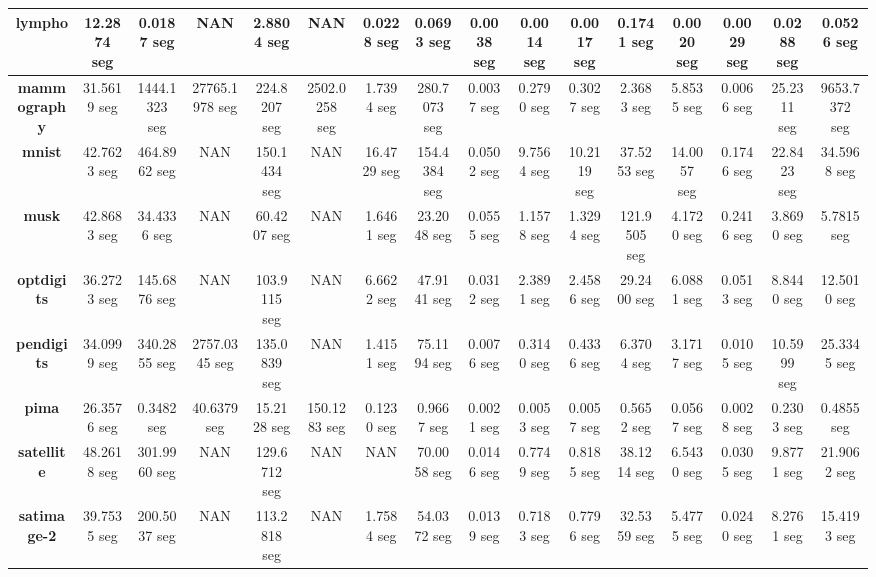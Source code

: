 \begin{table}[H]
{\begin{tabular}{|c|c|c|c|c|c|c|c|c|c|c|c|c|c|c|c|}
		\textbf{lympho}           & 12.2874 seg      & 0.0187 seg    & NAN             & 2.8804 seg    & NAN           & 0.0228 seg    & 0.0693 seg   & 0.0038 seg    & 0.0014 seg   & 0.0017 seg   & 0.1741 seg   & 0.0020 seg     & 0.0029 seg   & 0.0288 seg   & 0.0526 seg    \\ \hline
		\textbf{mammography}      & 31.5619 seg      & 1444.1323 seg & 27765.1978 seg  & 224.8207 seg  & 2502.0258 seg & 1.7394 seg    & 280.7073 seg & 0.0037 seg    & 0.2790 seg   & 0.3027 seg   & 2.3683 seg   & 5.8535 seg     & 0.0066 seg   & 25.2311 seg  & 9653.7372 seg \\ \hline
		\textbf{mnist}            & 42.7623 seg      & 464.8962 seg  & NAN             & 150.1434 seg  & NAN           & 16.4729 seg   & 154.4384 seg & 0.0502 seg    & 9.7564 seg   & 10.2119 seg  & 37.5253 seg  & 14.0057 seg    & 0.1746 seg   & 22.8423 seg  & 34.5968 seg   \\ \hline
		\textbf{musk}             & 42.8683 seg      & 34.4336 seg   & NAN             & 60.4207 seg   & NAN           & 1.6461 seg    & 23.2048 seg  & 0.0555 seg    & 1.1578 seg   & 1.3294 seg   & 121.9505 seg & 4.1720 seg     & 0.2416 seg   & 3.8690 seg   & 5.7815 seg    \\ \hline
		\textbf{optdigits}        & 36.2723 seg      & 145.6876 seg  & NAN             & 103.9115 seg  & NAN           & 6.6622 seg    & 47.9141 seg  & 0.0312 seg    & 2.3891 seg   & 2.4586 seg   & 29.2400 seg  & 6.0881 seg     & 0.0513 seg   & 8.8440 seg   & 12.5010 seg   \\ \hline
		\textbf{pendigits}        & 34.0999 seg      & 340.2855 seg  & 2757.0345 seg   & 135.0839 seg  & NAN           & 1.4151 seg    & 75.1194 seg  & 0.0076 seg    & 0.3140 seg   & 0.4336 seg   & 6.3704 seg   & 3.1717 seg     & 0.0105 seg   & 10.5999 seg  & 25.3345 seg   \\ \hline
		\textbf{pima}             & 26.3576 seg      & 0.3482 seg    & 40.6379 seg     & 15.2128 seg   & 150.1283 seg  & 0.1230 seg    & 0.9667 seg   & 0.0021 seg    & 0.0053 seg   & 0.0057 seg   & 0.5652 seg   & 0.0567 seg     & 0.0028 seg   & 0.2303 seg   & 0.4855 seg    \\ \hline
		\textbf{satellite}        & 48.2618 seg      & 301.9960 seg  & NAN             & 129.6712 seg  & NAN           & NAN           & 70.0058 seg  & 0.0146 seg    & 0.7749 seg   & 0.8185 seg   & 38.1214 seg  & 6.5430 seg     & 0.0305 seg   & 9.8771 seg   & 21.9062 seg   \\ \hline
		\textbf{satimage-2}       & 39.7535 seg      & 200.5037 seg  & NAN             & 113.2818 seg  & NAN           & 1.7584 seg    & 54.0372 seg  & 0.0139 seg    & 0.7183 seg   & 0.7796 seg   & 32.5359 seg  & 5.4775 seg     & 0.0240 seg   & 8.2761 seg   & 15.4193 seg   \\ \hline

\end{tabular}}
\end{table}
